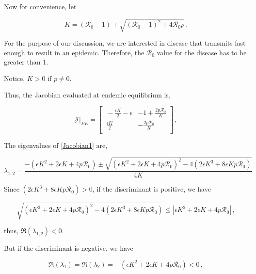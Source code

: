 \documentclass[12pt]{article}
\newcommand{\R}{\mathcal{R}}
\begin{document}
Now for convenience, let 
\begin{linenomath*}
\begin{equation}\label{E:}
K = (\R_0-1)+ \sqrt{(\R_0-1)^2+4\R_0 p} \,.
\end{equation}
\end{linenomath*}

For the purpose of our discussion, we are interested in disease that transmits fast enough to result in an epidemic. Therefore, the $\R_0$ value for the disease has to be greater than 1.

Notice, $K>0$ if $p\neq 0$.

Thus, the Jacobian evaluated at endemic equilibrium is,
\begin{linenomath*}
\begin{equation}
\mathcal{J}|_{EE} =
\begin{bmatrix}
    \ -\frac{\epsilon K}{2}-\epsilon       & -1+\frac{2p \R_0}{K} \\
    \ \frac{\epsilon K}{2}       & -\frac{2p \R_0}{K} \\
\end{bmatrix} \label{Jacobian1} \,,
\end{equation}
\end{linenomath*}

The eigenvalues of \autoref{Jacobian1} are,
\begin{linenomath*}
\begin{equation}
\lambda_{1,2} = \frac{-(\epsilon K^2+2\epsilon K +4p\mathcal{R}_0) \pm \sqrt{(\epsilon K^2+2\epsilon K +4p\mathcal{R}_0)^2-4(2\epsilon K^3+8\epsilon Kp\mathcal{R}_0)}}{4K}
\end{equation}
\end{linenomath*}

Since $(2\epsilon K^3+8\epsilon Kp\mathcal{R}_0)>0$, if the discriminant is positive, we have
\begin{linenomath*}
\begin{equation}
\sqrt{(\epsilon K^2+2\epsilon K +4p\mathcal{R}_0)^2-4(2\epsilon
  K^3+8\epsilon Kp\mathcal{R}_0)}
 \leq|\epsilon K^2+2\epsilon K +4p\mathcal{R}_0|  \,,
\end{equation}
\end{linenomath*}

thus, $\Re(\lambda_{1,2})<0$.

But if the discriminant is negative, we have
\begin{linenomath*}
\begin{equation}
\Re(\lambda_1)=\Re(\lambda_2)=-(\epsilon K^2+2\epsilon K +4p\mathcal{R}_0)<0  \,,
\end{equation}
\end{linenomath*}
\end{document}
